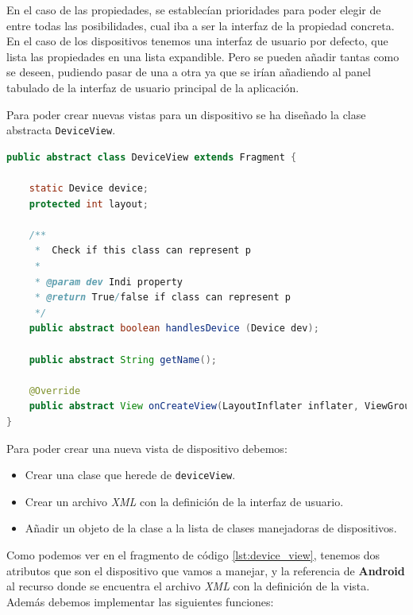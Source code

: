\bigskip
En el caso de las propiedades, se establecían prioridades para poder elegir de entre todas las posibilidades, cual iba a ser la interfaz de la propiedad concreta. En el caso de los dispositivos tenemos una interfaz de usuario por defecto, que lista las propiedades en una lista expandible. Pero se pueden añadir tantas como se deseen, pudiendo pasar de una a otra ya que se irían añadiendo al panel tabulado de la interfaz de usuario principal de la aplicación.

Para poder crear nuevas vistas para un dispositivo se ha diseñado la clase abstracta \texttt{DeviceView}.

\begin{lstlisting}[language=Java,caption={Clase abstracta DeviceView},label={lst:device_view}]
public abstract class DeviceView extends Fragment {

    static Device device;
    protected int layout;

    /**
     *  Check if this class can represent p
     *
     * @param dev Indi property
     * @return True/false if class can represent p
     */
    public abstract boolean handlesDevice (Device dev);

    public abstract String getName();

    @Override
    public abstract View onCreateView(LayoutInflater inflater, ViewGroup container, Bundle savedInstanceState);
}

\end{lstlisting}


\bigskip
Para poder crear una nueva vista de dispositivo debemos:

\begin{itemize}
  \item Crear una clase que herede de \texttt{deviceView}.
  \item Crear un archivo \textit{XML} con la definición de la interfaz de usuario.
  \item Añadir un objeto de la clase a la lista de clases manejadoras de dispositivos.
\end{itemize}


Como podemos ver en el fragmento de código \ref{lst:device_view}, tenemos dos atributos que son el dispositivo que vamos a manejar, y la referencia de \textbf{Android} al recurso donde se encuentra el archivo \textit{XML} con la definición de la vista. Además debemos implementar las siguientes funciones:


